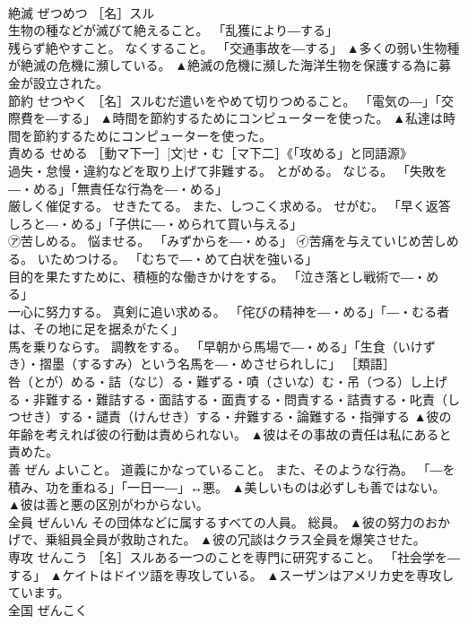 \documentclass[8pt]{extreport}
\begin{document}
\begin{CJK}{UTF8}{min}
\\	絶滅	ぜつめつ	［名］スル 
\\	生物の種などが滅びて絶えること。 「乱獲により―する」 
\\	残らず絶やすこと。 なくすること。 「交通事故を―する」	▲多くの弱い生物種が絶滅の危機に瀕している。 ▲絶滅の危機に瀕した海洋生物を保護する為に募金が設立された。
\\	節約	せつやく	［名］スルむだ遣いをやめて切りつめること。 「電気の―」「交際費を―する」	▲時間を節約するためにコンピューターを使った。 ▲私達は時間を節約するためにコンピューターを使った。
\\	責める	せめる	［動マ下一］[文]せ・む［マ下二］《「攻める」と同語源》 
\\	過失・怠慢・違約などを取り上げて非難する。 とがめる。 なじる。 「失敗を―・める」「無責任な行為を―・める」 
\\	厳しく催促する。 せきたてる。 また、しつこく求める。 せがむ。 「早く返答しろと―・める」「子供に―・められて買い与える」 
\\	㋐苦しめる。 悩ませる。 「みずからを―・める」 ㋑苦痛を与えていじめ苦しめる。 いためつける。 「むちで―・めて白状を強いる」 
\\	目的を果たすために、積極的な働きかけをする。 「泣き落とし戦術で―・める」 
\\	一心に努力する。 真剣に追い求める。 「侘びの精神を―・める」「―・むる者は、その地に足を据ゑがたく」 
\\	馬を乗りならす。 調教をする。 「早朝から馬場で―・める」「生食（いけずき）・摺墨（するすみ）という名馬を―・めさせられしに」 ［類語］
\\	咎（とが）める・詰（なじ）る・難ずる・嘖（さいな）む・吊（つる）し上げる・非難する・難詰する・面詰する・面責する・問責する・詰責する・叱責（しつせき）する・譴責（けんせき）する・弁難する・論難する・指弾する	▲彼の年齢を考えれば彼の行動は責められない。 ▲彼はその事故の責任は私にあると責めた。
\\	善	ぜん	よいこと。 道義にかなっていること。 また、そのような行為。 「―を積み、功を重ねる」「一日一―」↔悪。	▲美しいものは必ずしも善ではない。 ▲彼は善と悪の区別がわからない。
\\	全員	ぜんいん	その団体などに属するすべての人員。 総員。	▲彼の努力のおかげで、乗組員全員が救助された。 ▲彼の冗談はクラス全員を爆笑させた。
\\	専攻	せんこう	［名］スルある一つのことを専門に研究すること。 「社会学を―する」	▲ケイトはドイツ語を専攻している。 ▲スーザンはアメリカ史を専攻しています。
\\	全国	ぜんこく	

\end{CJK}
\end{document}

